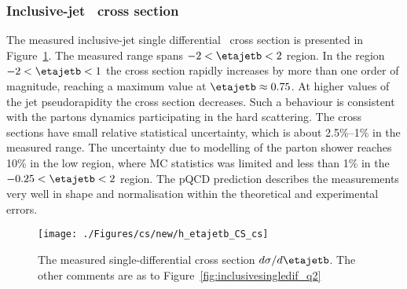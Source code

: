 \subsubsection*{Inclusive-jet \dsdetajetb~cross section}
The measured inclusive-jet single differential \dsdetajetb~cross section is presented in Figure~\ref{fig:inclusivesingledif_eta}. The measured range spans $-2 < \etajetb < 2$ region. In the region  $-2 < \etajetb < 1$ the cross section rapidly increases by more than one order of magnitude, reaching a maximum value at $\etajetb \approx 0.75$. At higher values of the jet pseudorapidity the cross section decreases. Such a behaviour is consistent with the partons dynamics participating in the hard scattering. The cross sections have small relative statistical uncertainty, which is about 2.5\%--1\% in the measured range. %
The uncertainty due to modelling of the parton shower reaches 10\% in the low \etajetb region, where MC statistics was limited and less than 1\% in the $-0.25 < \etajetb < 2$ region. The pQCD prediction describes the measurements very well in shape and normalisation within the theoretical and experimental errors.
\begin{figure}[p]
	\centering
		\texttt{[image: ./Figures/cs/new/h\_etajetb\_CS\_cs]}
	\caption{The measured single-differential cross section $d\sigma/d\etajetb$. The other comments are as to Figure~\ref{fig:inclusivesingledif_q2}}
	\label{fig:inclusivesingledif_eta}
\end{figure}

